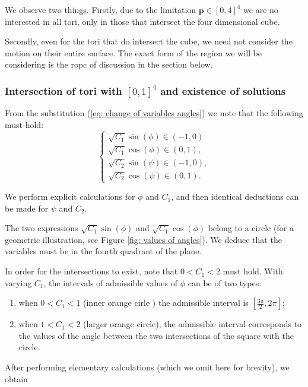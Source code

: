 \documentclass{article}
\def\p{\mathbf{p}}
\theoremstyle{definition}
\numberwithin{equation}{section}
\begin{document}
We observe two things. Firstly, due to the limitation $\p\in[0,4]^4$ we are no interested in all tori, only in those that intersect the four dimensional cube. 

Secondly, even for the tori that do intersect the cube, we need not consider the motion on their entire surface. The exact form of the region we will be considering is the ropc of discussion in the section below. 

\subsubsection{Intersection of tori with $[0,1]^4$ and existence of solutions}

From the substitution (\ref{eq: change of variables angles}) we note that  the following must hold:
\[
\begin{cases}
    \sqrt{C_1}\sin(\phi)\in(-1,0)\\
     \sqrt{C_1}\cos(\phi)\in(0,1),\\
     \sqrt{C_2}\sin(\psi)\in(-1,0),\\ \sqrt{C_2}\cos(\psi)\in(0,1).
\end{cases}
\]

We perform explicit calculations for $\phi$ and $C_1$, and then identical deductions can be made for $\psi$ and $C_2$. 

The two expressions $\sqrt{C_1}\sin(\phi)$ and $\sqrt{C_1}\cos(\phi)$ belong to a circle (for a geometric illustration, see Figure \ref{fig: values of angles}). We deduce that the variables must be in the fourth quadrant of the plane. 

In order for the intersections to exist, note that $0<C_1<2$ must hold. With varying $C_1$, the intervals  of  admissible values of $\phi$ can be of two types:
\begin{enumerate}
    \item when $0<C_1<1$ (inner orange cirle ) the admissible interval is $\left[\frac{3\pi}{2}, 2\pi\right]$;
    \item when $1<C_1<2$ (larger orange circle), the admissible interval corresponds to the values of the angle between the two intersections of the square with the circle. 
\end{enumerate} 
After performing elementary calculations (which we omit here for brevity), we obtain
\end{document}
